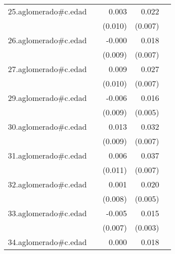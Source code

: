 {\begin{longtable}{l*{4}{D{.}{.}{-1}}}
\addlinespace
25.aglomerado#c.edad&                     &       0.003         &       0.022\sym{**} &                     \\
            &                     &     (0.010)         &     (0.007)         &                     \\
\addlinespace
26.aglomerado#c.edad&                     &      -0.000         &       0.018\sym{**} &                     \\
            &                     &     (0.009)         &     (0.007)         &                     \\
\addlinespace
27.aglomerado#c.edad&                     &       0.009         &       0.027\sym{***}&                     \\
            &                     &     (0.010)         &     (0.007)         &                     \\
\addlinespace
29.aglomerado#c.edad&                     &      -0.006         &       0.016\sym{***}&                     \\
            &                     &     (0.009)         &     (0.005)         &                     \\
\addlinespace
30.aglomerado#c.edad&                     &       0.013         &       0.032\sym{***}&                     \\
            &                     &     (0.009)         &     (0.007)         &                     \\
\addlinespace
31.aglomerado#c.edad&                     &       0.006         &       0.037\sym{***}&                     \\
            &                     &     (0.011)         &     (0.007)         &                     \\
\addlinespace
32.aglomerado#c.edad&                     &       0.001         &       0.020\sym{***}&                     \\
            &                     &     (0.008)         &     (0.005)         &                     \\
\addlinespace
33.aglomerado#c.edad&                     &      -0.005         &       0.015\sym{***}&                     \\
            &                     &     (0.007)         &     (0.003)         &                     \\
\addlinespace
34.aglomerado#c.edad&                     &       0.000         &       0.018\sym{***}&                     \\

\end{longtable}}
